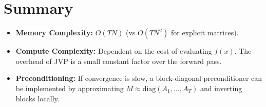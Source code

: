 \documentclass{article}
\begin{document}
\section{Summary}
\begin{itemize}
    \item \textbf{Memory Complexity:} $O(TN)$ (vs $O(TN^2)$ for explicit matrices).
    \item \textbf{Compute Complexity:} Dependent on the cost of evaluating $f(x)$. The overhead of JVP is a small constant factor over the forward pass.
    \item \textbf{Preconditioning:} If convergence is slow, a block-diagonal preconditioner can be implemented by approximating $M \approx \text{diag}(A_1, \dots, A_T)$ and inverting blocks locally.
\end{itemize}
\end{document}
